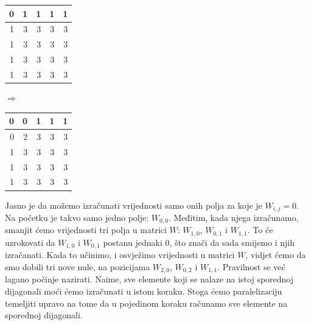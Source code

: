 \documentclass[times, utf8, zavrsni]{fer}
\begin{document}
\begin{tabularx}{100pt}{|R|R|R|R|R|}
 \hline
  0 & 1 & 1 & 1 & 1 \\  & 3 & 3 & 3 & 3 \\  & 3 & 3 & 3 & 3 \\  & 3 & 3 & 3 & 3 \\  & 3 & 3 & 3 & 3 \\ \hline
\end{tabularx}
$\Rightarrow$
\begin{tabularx}{100pt}{|R|R|R|R|R|}
 \hline
  0 &  0 & 1 & 1 & 1 \\ \hline
  0 & 2 & 3 & 3 & 3 \\  & 3 & 3 & 3 & 3 \\  & 3 & 3 & 3 & 3 \\  & 3 & 3 & 3 & 3 \\ \hline
\end{tabularx}

Jasno je da možemo izračunati vrijednosti samo onih polja
za koje je $W_{i,j}=0$. Na početku je takvo samo jedno polje:
$W_{0,0}$. Međitim, kada njega izračunamo, smanjit ćemo
vrijednosti tri polja u matrici $W$: $W_{1,0}$, $W_{0,1}$ i
$W_{1,1}$. To će uzrokovati da $W_{1,0}$ i $W_{0,1}$ postanu
jednaki $0$, što znači da sada smijemo i njih izračanati.
Kada to učinimo, i osvježimo vrijednosti u matrici $W$, 
vidjet ćemo da smo dobili tri nove nule, na pozicijama
$W_{2,0}$, $W_{0,2}$ i $W_{1,1}$. Pravilnost se već
lagano počinje nazirati. Naime, sve elemente koji 
se nalaze na istoj sporednoj dijagonali moći ćemo 
izračunati u istom koraku. Stoga ćemo paralelizaciju
temeljiti upravo na tome da u pojedinom koraku
računamo sve elemente na sporednoj dijagonali. 
\end{document}
